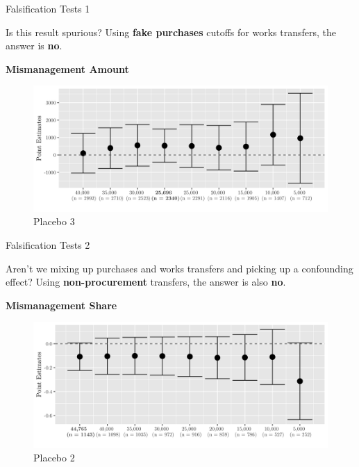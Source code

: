 \documentclass[10pt,ignorenonframetext,]{beamer}
\begin{document}
\begin{frame}{Falsification Tests 1}
\protect\hypertarget{falsification-tests-1-2}{}

Is this result spurious? Using \textbf{fake purchases} cutoffs for works
transfers, the answer is \textbf{no}.

\textbf{Mismanagement Amount}

\begin{figure}
\centering
\includegraphics{./images/01falsificationplot3.png}
\caption{Placebo 3}
\end{figure}

\end{frame}

\begin{frame}{Falsification Tests 2}
\protect\hypertarget{falsification-tests-2-1}{}

Aren't we mixing up purchases and works transfers and picking up a
confounding effect? Using \textbf{non-procurement} transfers, the answer
is also \textbf{no}.

\textbf{Mismanagement Share}

\begin{figure}
\centering
\includegraphics{./images/02falsificationplot2.png}
\caption{Placebo 2}
\end{figure}

\end{frame}
\end{document}
